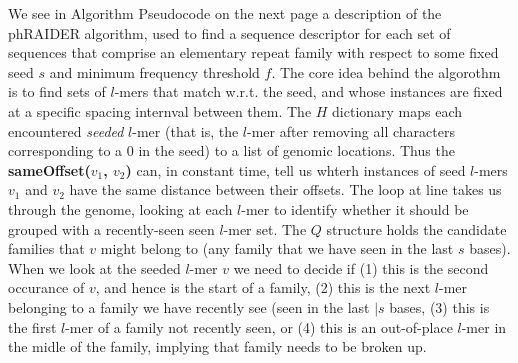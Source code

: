 \documentclass[11pt,letterpaper]{amsart}
\begin{document}
We see in Algorithm Pseudocode on the next page a description of the
phRAIDER algorithm, used to find a sequence descriptor for each set of
sequences that comprise an elementary repeat family with respect to
some fixed seed $s$ and minimum frequency threshold $f$. The core idea
behind the algorothm is to find sets of $l$-mers that match w.r.t. the
seed, and whose instances are fixed at a specific spacing internval
between them.  The $H$ dictionary maps each encountered {\it seeded}
$l$-mer (that is, the $l$-mer after removing all characters
corresponding to a 0 in the seed) to a list of genomic locations.
Thus the {\bf sameOffset($v_1$, $v_2$)} can, in constant time, tell us
whterh instances of seed $l$-mers $v_1$ and $v_2$ have the same
distance between their offsets. The loop at line
 takes us through the genome, looking at
each $l$-mer to identify whether it should be grouped with a
recently-seen seen $l$-mer set.  The $Q$ structure holds the candidate
families that $v$ might belong to (any family that we have seen in the
last $s$ bases).  When we look at the seeded $l$-mer $v$ we need to
decide if (1) this is the second occurance of $v$, and hence is the
start of a family, (2) this is the next $l$-mer belonging to a family
we have recently see (seen in the last $|s$ bases, (3) this is the
first $l$-mer of a family not recently seen, or (4) this is an
out-of-place $l$-mer in the midle of the family, implying that family
needs to be broken up.
\end{document}
